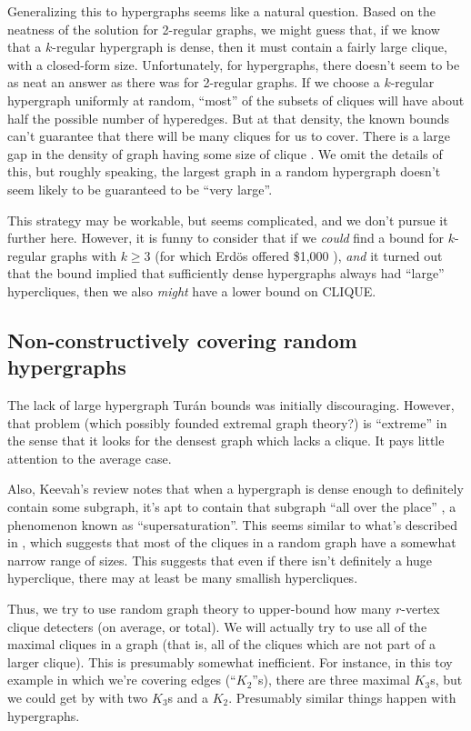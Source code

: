 \documentclass[12pt]{article}
\theoremstyle{definition}
\begin{document}
Generalizing this to hypergraphs seems like a natural question.
Based on the neatness of the solution for 2-regular graphs,
we might guess that, if we know that a $k$-regular hypergraph is dense,
then it must contain a fairly large clique, with a closed-form size.
Unfortunately, for hypergraphs, there doesn't seem to be as neat
an answer as there was for 2-regular graphs. 
If we choose a $k$-regular hypergraph uniformly at random,
``most'' of the subsets of cliques will have about half the
possible number of hyperedges. But at that density,
the known
bounds can't guarantee that there will be many cliques for us to cover.
There is a large gap in the density of graph having some size
of clique
\cite{keevash2011hypergraph}. We omit the details of this, but
roughly speaking,
the largest graph in a random hypergraph doesn't seem likely to be
guaranteed to be ``very large''.

This strategy may be workable, but seems complicated, and we don't pursue
it further here.
However, it is funny to consider that if we {\em could} find a
bound for $k$-regular graphs with $k \ge 3$
(for which Erd\"os offered \$1,000 \cite{keevash2011hypergraph}),
{\em and} it turned
out that the bound implied that sufficiently dense hypergraphs always had
``large'' hypercliques, then we also {\em might} have a
lower bound on CLIQUE.

\subsection{Non-constructively covering random hypergraphs}

The lack of large hypergraph Tur\'an bounds was initially discouraging.
However, that problem (which possibly founded extremal graph theory?) is
``extreme'' in the sense that it looks for the densest graph which lacks
a clique. It pays little attention to the average case.

Also, Keevah's review notes that when a hypergraph is dense enough to
definitely contain some subgraph, it's apt to contain that subgraph
``all over the place'' \cite{keevash2011hypergraph}, a phenomenon
known as ``supersaturation''.  This seems similar to what's
described in \cite{bollobas1976cliques}, which suggests that most of
the cliques in a random graph have a somewhat narrow range of sizes.
This suggests that even if there isn't definitely a huge hyperclique,
there may at least be many smallish hypercliques.

Thus, we try to use random graph theory to upper-bound how many
$r$-vertex clique detecters (on average, or total). We will actually
try to use all of the maximal cliques in a graph (that is, all of the
cliques which are not part of a larger clique). This is presumably
somewhat inefficient.
For instance, in this toy example in which we're covering edges
(``$K_2$''s), there
are three maximal $K_3$s, but we could get by with two $K_3$s and
a $K_2$. Presumably similar things happen with hypergraphs.
\end{document}
